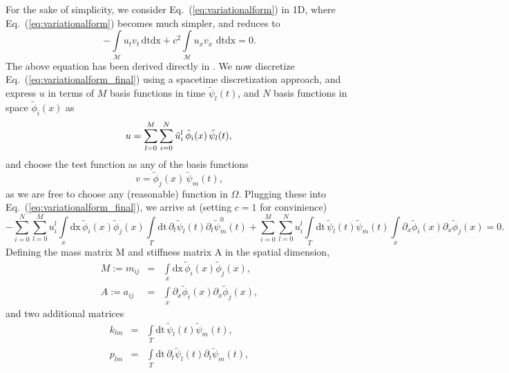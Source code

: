 \documentclass[nofootinbib,preprintnumbers,superscriptaddress,notitlepage]{revtex4-1}
\newcommand{\<}{\begin{equation}}
\newcommand{\?}{\end{equation}}
\begin{document}
For the sake of simplicity, we consider Eq.~(\ref{eq:variationalform}) in 1D,
where Eq.~(\ref{eq:variationalform}) becomes much simpler, and reduces to
\begin{equation}
\label{eq:variationalform_final}
- \int\limits_{\mathcal{M}} u_t v_t \mathrm{\,dt dx}
+ c^2\int\limits_{\mathcal{M}} u_x v_x \,\mathrm{\,dt dx}
= 0.
\end{equation}
The above equation has been derived directly in \cite{Zumbusch}. We now
discretize Eq.~(\ref{eq:variationalform_final}) using a spacetime
discretization approach, and express $u$ in terms of $M$ basis functions in
time $\tilde{\psi}_l(t)$, and $N$ basis functions in space $\tilde{\phi}_i(x)$
as
\begin{equation}
u = \sum\limits_{l=0}^{M}\sum\limits_{i=0}^{N}\tilde{u}_i^l \, \tilde{\phi}_i(x)\, \tilde{\psi}_l(t), \\
\end{equation}
and choose the test function as any of the basis functions
\begin{equation}
v = \tilde{\phi}_j(x)\, \tilde{\psi}_m(t),
\end{equation}
as we are free to choose any (reasonable) function in $\Omega$. Plugging these
into Eq.~(\ref{eq:variationalform_final}), we arrive at (setting $c=1$ for convinience)
\begin{equation}
\label{eq:summation_expanded}
- \sum\limits_{i=0}^{N}\sum\limits_{l=0}^{M} u_i^l 
\int\limits_{x} \mathrm{dx}\, \tilde{\phi}_i(x)\tilde{\phi}_j(x)
\int\limits_{T} \mathrm{dt}\, \partial_t\tilde{\psi}_l(t)\partial_t\tilde{\psi}_m^0(t)
+ \sum\limits_{i=0}^{M}\sum\limits_{l=0}^{N} u_i^l 
\int\limits_{T} \mathrm{dt}\, \tilde{\psi}_l(t)\tilde{\psi}_m(t)
\int\limits_{x} \partial_x\tilde{\phi}_i(x)\partial_x\tilde{\phi}_j(x) = 0.
\end{equation}
Defining the mass matrix M and stiffness matrix A in the spatial dimension,
\begin{eqnarray}
\label{eq:matrix_space}
M := m_{ij} &=& \int\limits_{x} \mathrm{dx}\, \tilde{\phi}_i(x)\tilde{\phi}_j(x), \\
A := a_{ij} &=& \int\limits_{x} \partial_x\tilde{\phi}_i(x)\partial_x\tilde{\phi}_j(x),
\end{eqnarray}
and two additional matrices
\begin{eqnarray}
\label{eq:matrix_time}
k_{lm} &=& \int\limits_{T} \mathrm{dt}\, \tilde{\psi}_l(t)\tilde{\psi}_m(t), \\
p_{lm} &=& \int\limits_{T} \mathrm{dt}\, \partial_t\tilde{\psi}_l(t)\partial_t\tilde{\psi}_m(t),
\end{eqnarray}
\end{document}
